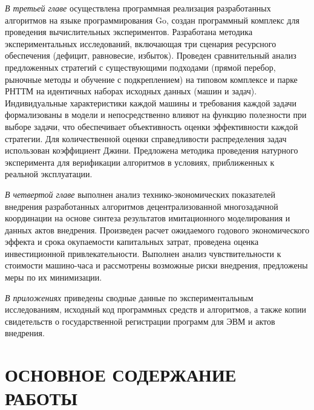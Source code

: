 \textit{В третьей главе} осуществлена программная реализация разработанных алгоритмов на языке программирования Go, создан программный комплекс для проведения вычислительных экспериментов. Разработана методика экспериментальных исследований, включающая три сценария ресурсного обеспечения (дефицит, равновесие, избыток). Проведен сравнительный анализ предложенных стратегий с существующими подходами (прямой перебор, рыночные методы и обучение с подкреплением) на типовом комплексе и парке РНТТМ на идентичных наборах исходных данных (машин и задач). Индивидуальные характеристики каждой машины и требования каждой задачи формализованы в модели и непосредственно влияют на функцию полезности при выборе задачи, что обеспечивает объективность оценки эффективности каждой стратегии. Для количественной оценки справедливости распределения задач использован коэффициент Джини. Предложена методика проведения натурного эксперимента для верификации алгоритмов в условиях, приближенных к реальной эксплуатации.

\textit{В четвертой главе} выполнен анализ технико-экономических показателей внедрения разработанных алгоритмов децентрализованной многозадачной координации на основе синтеза результатов имитационного моделирования и данных актов внедрения. Произведен расчет ожидаемого годового экономического эффекта и срока окупаемости капитальных затрат, проведена оценка инвестиционной привлекательности. Выполнен анализ чувствительности к стоимости машино-часа и рассмотрены возможные риски внедрения, предложены меры по их минимизации.

\textit{В приложениях} приведены сводные данные по экспериментальным исследованиям, исходный код программных средств и алгоритмов, а также копии свидетельств о государственной регистрации программ для ЭВМ и актов внедрения.

\section*{\MakeUppercase{Основное содержание работы}}


